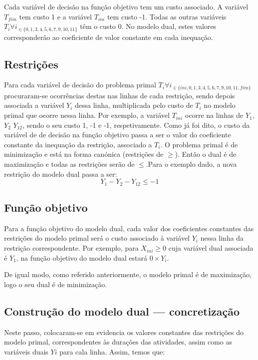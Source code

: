 Cada variável de decisão na função objetivo tem um custo associado. A variável
$T_{fim}$ tem custo 1 e a variável $T_{ini}$ tem custo -1. Todas as outras variáveis
$T_i \forall i_{\in\{0, 1, 3, 4,5,6,7,9,10,11\}}$ têm o custo 0. No modelo dual,
estes valores corresponderão ao coeficiente de valor constante em cada
inequação.

\subsection{Restrições}
Para cada variável de decisão do problema primal $ T_i \forall i_{\in\{ini, 0,
1, 3,4,5,6,7,9,10,11,fim\}}$ procuraram-se ocorrências destas nas linhas de cada
restrição, sendo depois associada a variável $Y_i$ dessa linha, multiplicada
pelo custo de $T_i$ no modelo primal que ocorre nessa linha. Por exemplo,
a variável $T_{ini}$ ocorre na linhas de $Y_1$, $Y_2$ $Y_{12}$, sendo o seu
custo 1, -1 e -1, respetivamente. Como já foi dito, o custo da variável de de
decisão na função objetivo passa a ser o valor do coeficiente constante da
inequação da restrição, associado a $T_i$. O problema primal é de minimização
e está na forma canónica (restrições de $\ge$). Então o dual é de maximização
e todas as restrições serão de $\le$.Para o exemplo dado, a nova restrição do
modelo dual passa a ser: $$Y_1 - Y_2 - Y_{12} \le -1$$


\subsection{Função objetivo}
Para a função objetivo do modelo dual, cada valor dos coeficientes constantes
das restrições do modelo primal será o custo associado à variável $Y_i$ nessa
linha da restrição correspondente. Por exemplo, para $X_{ini} \ge 0$ cuja
variável dual associada é $Y_1$, na função objetivo do modelo dual estará
$0 \times Y_i$.

De igual modo, como referido anteriormente, o modelo primal é de maximização,
logo o seu dual é de minimização.

\newpage
\subsection{Construção do modelo dual --- concretização}
Neste passo, colocaram-se em evidencia os valores constantes das restrições do
modelo primal, correspondentes às durações das atividades, assim como as
variáveis duais $Yi$ para cala linha. Assim, temos que:


